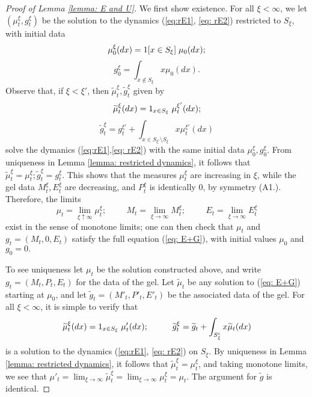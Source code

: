 \begin{proof}[Proof of Lemma \ref{lemma: E and U}] 
We first show existence. For all $\xi<\infty$, we let $(\mu^\xi_t, g^\xi_t)$ be the solution to the dynamics (\ref{eq:rE1}, \ref{eq: rE2}) restricted to $S_\xi$, with initial data \begin{equation} \mu^\xi_0(dx)=1[x\in S_\xi]\hspace{0.1cm}\mu_0(dx); \end{equation} \begin{equation} g^\xi_0 = \int_{x\not\in S_\xi} x\mu_0(dx). \end{equation}  Observe that, if $\xi<\xi'$, then $\widetilde{\mu}^\xi_t, \widetilde{g}^\xi_t$ given by \begin{equation} \widetilde{\mu}^\xi_t(dx)=1_{x\in S_\xi}\hspace{0.1cm}\mu^{\xi'}_t(dx);\end{equation} \begin{equation} \widetilde{g}^\xi_t=g^{\xi'}_t+\int_{x\in S_{\xi'}\setminus S_\xi} x \mu^{\xi'}_t(dx)\end{equation} solve the dymanics (\ref{eq:rE1},\ref{eq: rE2}) with the same initial data $\mu^\xi_0, g^\xi_0$. From uniqueness in Lemma \ref{lemma: restricted dynamics}, it follows that $\widetilde{\mu}^\xi_t=\mu^\xi_t; \widetilde{g}^\xi_t=g^\xi_t$. This shows that the measures $\mu^\xi_t$ are increasing in $\xi$, while the gel data $M^\xi_t, E^\xi_t$ are decreasing, and $P^\xi_t$ is identically $0$, by symmetry ({A1}.). Therefore, the limits \begin{equation} \mu_t=\lim_{\xi\uparrow \infty} \mu^\xi_t; \hspace{1cm} M_t=\lim_{\xi\rightarrow \infty} M^\xi_t; \hspace{1cm} E_t=\lim_{\xi\rightarrow \infty} E^\xi_t \end{equation} exist in the sense of monotone limits; one can then check that $\mu_t$ and $g_t=(M_t,0,E_t)$ satisfy the full equation (\ref{eq: E+G}), with initial values $\mu_0$ and $g_0=0.$

To see uniqueness let $\mu_t$ be the solution constructed above, and write $g_t=(M_t,P_t,E_t)$ for the data of the gel. Let $\widetilde{\mu}_t$ be any solution to (\ref{eq: E+G}) starting at $\mu_0$, and let $\widetilde{g}_t=(M'_t, P'_t,E'_t)$ be the associated data of the gel. For all $\xi<\infty$, it is simple to verify that \begin{equation} \widetilde{\mu}^\xi_t(dx)=1_{x\in S_\xi}\hspace{0.1cm} \mu'_t(dx);\hspace{1cm} \widetilde{g}^\xi_t=\widetilde{g}_t+\int_{S^\mathrm{c}_\xi} x \widetilde{\mu}_t(dx) \end{equation} is a solution to the dynamics (\ref{eq:rE1}, \ref{eq: rE2}) on $S_\xi$. By uniqueness in Lemma \ref{lemma: restricted dynamics}, it follows that $\widetilde{\mu}^\xi_t=\mu^\xi_t$, and taking monotone limits, we see that $\mu'_t=\lim_{\xi\rightarrow \infty} \widetilde{\mu}^\xi_t=\lim_{\xi\rightarrow \infty} {\mu}^\xi_t=\mu_t$. The argument for $\widetilde{g}$ is identical.
\end{proof}
\iffalse 
